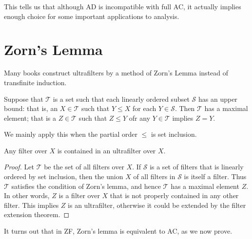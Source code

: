 \documentclass[12pt, a4paper, oneside, openright, titlepage]{book}
\begin{document}
This tells us that although AD is incompatible with full AC, it actually implies enough choice for some important applications to analysis.


\section{Zorn's Lemma}

Many books construct ultrafilters by a method of Zorn's Lemma instead of transfinite induction.

\begin{defn}
    Suppose that $\mathcal{T}$ is a set such that each linearly ordered subset $\mathcal{S}$ has an upper bound: that is, an $X \in \mathcal{T}$ such that $Y \leq X$ for each $Y \in \mathcal{S}$. Then $\mathcal{T}$ has a maximal element; that is a $Z \in \mathcal{T}$ such that $Z \leq Y$ ofr any $Y \in \mathcal{T}$ implies $Z = Y$.
\end{defn}

We mainly apply this when the partial order $\leq$ is set inclusion.

\begin{thm}
    Any filter over $X$ is contained in an ultrafilter over $X$.
\end{thm}
\begin{proof}
    Let $\mathcal{T}$ be the set of all filters over $X$. If $\mathcal{S}$ is a set of filters that is linearly ordered by set inclusion, then the union $X$ of all filters in $\mathcal{S}$ is itself a filter. Thus $\mathcal{T}$ satisfies the condition of Zorn's lemma, and hence $\mathcal{T}$ has a maximal element $Z$. In other words, $Z$ is a filter over $X$ that is not properly contained in any other filter. This implies $Z$ is an ultrafilter, otherwise it could be extended by the filter extension theorem.
\end{proof}

It turns out that in ZF, Zorn's lemma is equivalent to AC, as we now prove.
\end{document}
